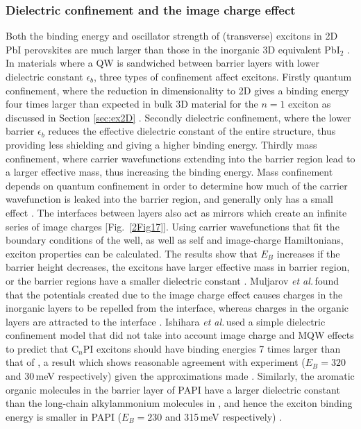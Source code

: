 \subsubsection{Dielectric confinement and the image charge effect}
\label{sec:confinement}
Both the binding energy and oscillator strength of (transverse) excitons in 2D PbI perovskites are much larger than those in the inorganic 3D equivalent Pb$\textrm{I}_2$ \cite{Hirasawa1994}. In materials where a QW is sandwiched between barrier layers with lower dielectric constant $\epsilon_b$, three types of confinement affect excitons. Firstly quantum confinement, where the reduction in dimensionality to 2D gives a binding energy four times larger than expected in bulk 3D material for the $n=1$ exciton as discussed in Section \ref{sec:ex2D} \cite{Shinada1966}. Secondly dielectric confinement, where the lower barrier $\epsilon_b$ reduces the effective dielectric constant of the entire structure, thus providing less shielding and giving a higher binding energy. Thirdly mass confinement, where carrier wavefunctions extending into the barrier region lead to a larger effective mass, thus increasing the binding energy. Mass confinement depends on quantum confinement in order to determine how much of the carrier wavefunction is leaked into the barrier region, and generally only has a small effect \cite{Kumagai1989}. The interfaces between layers also act as mirrors which create an infinite series of image charges [Fig.\ \ref{2Fig17}]. Using carrier wavefunctions that fit the boundary conditions of the well, as well as self and image-charge Hamiltonians, exciton properties can be calculated. The results show that $E_B$ increases if the barrier height decreases, the excitons have larger effective mass in barrier region, or the barrier regions have a smaller dielectric constant \cite{Kumagai1989}. Muljarov \textit{et al.\,}found that the potentials created due to the image charge effect causes charges in the inorganic layers to be repelled from the interface, whereas charges in the organic layers are attracted to the interface \cite{Muljarov1995}. Ishihara \textit{et al.\,}used a simple dielectric confinement model that did not take into account image charge and MQW effects to predict that C$_n$PI excitons should have binding energies 7 times larger than that of , a result which shows reasonable agreement with experiment ($E_B=320$ and 30\,meV respectively) given the approximations made \cite{Ishihara1990}. Similarly, the aromatic organic molecules in the barrier layer of PAPI have a larger dielectric constant than the long-chain alkylammonium molecules in , and hence the exciton binding energy is smaller in PAPI ($E_B=230$ and 315\,meV respectively) \cite{Hong1992a}.

